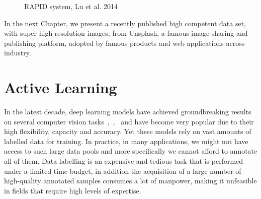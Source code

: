 \begin{figure}[ht!]
    \centering  
    \caption{RAPID system, Lu et al. 2014~\cite{lu2014rapid}}
    \label{c3:ava_crap}
\end{figure}    
    
In the next Chapter, we present a recently published high competent data set, with super high resolution images, from Unsplash, a famous image sharing and publishing platform, adopted by famous products and web applications across industry.



\section{Active Learning}

In the latest decade, deep learning models have achieved groundbreaking results on several computer vision tasks~\cite{he2015delving},~\cite{krizhevsky2012imagenet},~\cite{he2016deep} and have become very popular due to their high flexibility, capacity and accuracy. Yet these models rely on vast amounts of labelled data for training. In practice, in many applications, we might not have access to such large data pools and more specifically we cannot afford to annotate all of them. Data labelling is an expensive and tedious task that is performed under a limited time budget, in addition the acquisition of a large number of high-quality annotated samples consumes a lot of manpower, making it unfeasible in fields that require high levels of expertise.

